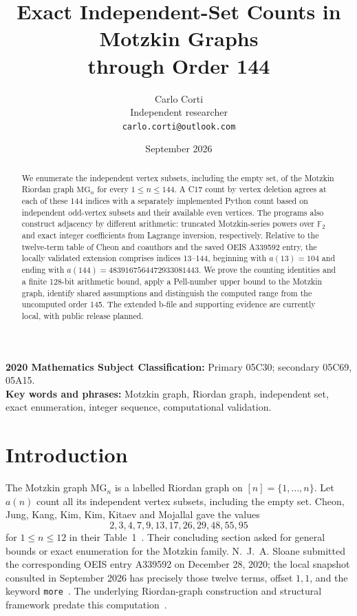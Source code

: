 \documentclass[11pt,a4paper]{article}
\title{Exact Independent-Set Counts in Motzkin Graphs\\through Order 144}
\author{Carlo Corti\\Independent researcher\\\texttt{carlo.corti@outlook.com}}
\date{September 2026}
\newcommand{\MG}{\mathrm{MG}}
\begin{document}
\maketitle

\begin{abstract}
We enumerate the independent vertex subsets, including the empty set, of the
Motzkin Riordan graph $\MG_n$ for every $1\leq n\leq144$.  A C17 count by
vertex deletion agrees at each of these 144 indices with a separately
implemented Python count based on independent odd-vertex subsets and their
available even vertices.  The programs also construct adjacency by different
arithmetic: truncated Motzkin-series powers over $\mathbb F_2$ and exact
integer coefficients from Lagrange inversion, respectively.  Relative to
the twelve-term table of Cheon and coauthors and the saved OEIS A339592
entry, the locally validated extension comprises indices 13--144, beginning
with $a(13)=104$ and ending with
$a(144)=4839167564472933081443$.  We prove the counting identities and a
finite 128-bit arithmetic bound, apply a Pell-number upper bound to the
Motzkin graph, identify shared assumptions and distinguish
the computed range from the uncomputed order 145.  The extended b-file and
supporting evidence are currently local, with public release planned.
\end{abstract}
\noindent\textbf{2020 Mathematics Subject Classification:} Primary 05C30;
secondary 05C69, 05A15.\\
\textbf{Key words and phrases:} Motzkin graph, Riordan graph, independent set,
exact enumeration, integer sequence, computational validation.

\section{Introduction}\label{sec:intro}
The Motzkin graph $\MG_n$ is a labelled Riordan graph on $[n]=\{1,\ldots,n\}$.
Let $a(n)$ count all its independent vertex subsets, including the empty set.
Cheon, Jung, Kang, Kim, Kim, Kitaev and Mojallal gave the values
\[
2,3,4,7,9,13,17,26,29,48,55,95
\]
for $1\leq n\leq12$ in their Table~1~\cite{counting}.  Their concluding
section asked for general bounds or exact enumeration for the Motzkin
family.  N.~J.~A. Sloane
submitted the corresponding OEIS entry A339592 on December 28, 2020; the
local snapshot consulted in September 2026 has precisely those twelve terms,
offset $1,1$, and the keyword
\texttt{more}~\cite{oeis}.  The underlying Riordan-graph construction and
structural framework predate this computation~\cite{structure}.
\end{document}
